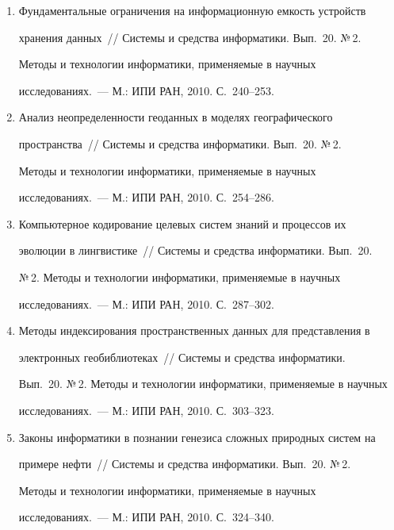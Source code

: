 \begin{enumerate}[1.]
Новая парадигма информатизации образования: эволюция терминов в 


контексте проблемы терминологической размытости~/\!\!/ Сис\-те\-мы и 


средства информатики. Вып.~20. №\,2. Методы и технологии информатики, 


применяемые в научных исследованиях.~--- М.: ИПИ РАН, 2010. 


С.~209--239.


\item {}


Фундаментальные ограничения на информационную емкость устройств 


хранения данных~/\!\!/ Сис\-те\-мы и средства информатики. Вып.~20. №\,2. 


Методы и технологии информатики, применяемые в научных 


исследованиях.~--- М.: ИПИ РАН, 2010. С.~240--253.


\item {}


Анализ неопределенности геоданных в моделях географического 


пространства~/\!\!/ Сис\-те\-мы и средства информатики. Вып.~20. №\,2. 


Методы и технологии информатики, применяемые в научных 


исследованиях.~--- М.: ИПИ РАН, 2010. С.~254--286. 


\item {}


Компьютерное кодирование целевых систем знаний и процессов их 


эволюции в лингвистике~/\!\!/ Сис\-те\-мы и средства информатики. Вып.~20. 


№\,2. Методы и технологии информатики, применяемые в научных 


исследованиях.~--- М.: ИПИ РАН, 2010. С.~287--302.


\item {}


Методы индексирования пространственных данных для представления в 


электронных геобиблиотеках~/\!\!/ Сис\-те\-мы и средства информатики. 


Вып.~20. №\,2. Методы и технологии информатики, применяемые в научных 


исследованиях.~--- М.: ИПИ РАН, 2010. С.~303--323.


\item {}


Законы информатики в познании генезиса сложных природных систем на 


примере нефти~/\!\!/ Сис\-те\-мы и средства информатики. Вып.~20. №\,2. 


Методы и технологии информатики, применяемые в научных 


исследованиях.~--- М.: ИПИ РАН, 2010. С.~324--340.


  \end{enumerate}


